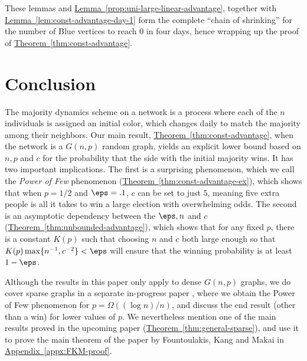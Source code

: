 \documentclass[11pt]{article}
\numberwithin{equation}{section}
\theoremstyle{definition}
\theoremstyle{plain}
\newcommand{\expref}[2]{\hyperref[#2]{#1~\ref{#2}}}
\begin{document}
			These lemmas and \expref{Lemma}{prop:uni-large-linear-advantage}, together with \expref{Lemma}{lem:const-advantage-day-1} form the complete ``chain of shrinking'' for the number of Blue vertices to reach $0$ in four days, hence wrapping up the proof of \expref{Theorem}{thm:const-advantage}.
			
			
			
			

			\section{Conclusion} \label{sec:related}
			
			The majority dynamics scheme on a network is a process where each of the $n$ individuals is assigned an initial color, which changes daily to match the majority among their neighbors.
			Our main result, \expref{Theorem}{thm:const-advantage}, when the network is a $G(n, p)$ random graph, yields an explicit %
			lower bound  %
			based on $n, p$ and $c$ for the probability that the side with the initial majority wins. It has two important implications. The first is a surprising phenomenon, which we call
			the  %
			\emph{Power of Few} phenomenon (\expref{Theorem}{thm:const-advantage-ex}), which shows that when $p=1/2$ and $\eps =.1$, $c$ can be set to just $5$, meaning five extra people is all it takes to win a large election with overwhelming odds. The second is an asymptotic dependency between the $\eps, n$ and $c$ (\expref{Theorem}{thm:unbounded-advantage}), which shows that for any fixed $p$, there is a constant $K(p)$ such that choosing $n$ and $c$ both large enough so that $K(p)\max \{n^{-1}, c^{-2} \} < \eps$ will ensure that the winning probability is at least $1 - \eps$.
			
			
			Although the results in this paper only 
			apply to  %
			dense $G(n, p)$ graphs, we do cover sparse graphs in a separate in-progress paper \cite{TranVusparse}, where we obtain the Power of Few phenomenon for $p = \Omega((\log n)/n)$, and discuss the end result (other than a win) for lower values of $p$. We nevertheless %
			mention  %
			one of the main 
			results proved in  %
			the upcoming paper (\expref{Theorem}{thm:general-sparse}), 
			and %
			use it  %
			to prove the main theorem
			of  %
			the paper \cite{fountoulakis} by Fountoulakis, Kang and Makai in \expref{Appendix}{appx:FKM-proof}.
			
			
\end{document}
